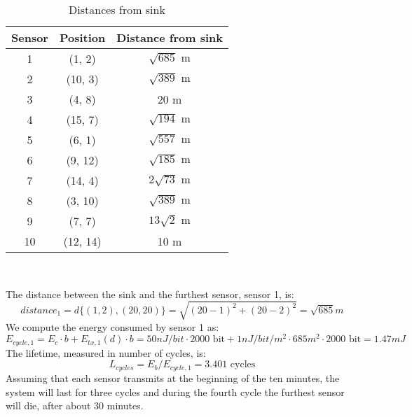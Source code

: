 \begin{table}[H]
\centering 
\begin{tabular}{| c | c | c |}
	\hline 
	\rowcolor{bluepoli!40}
	\textbf{Sensor} & \textbf{Position} & \textbf{Distance from sink}\T\B \\
	\hline 
	1 & (1, 2) & $\sqrt{685} \text{ m}$ \T\B\\
	2 &(10, 3) & $\sqrt{389} \text{ m}$ \T\B\\
	3 & (4, 8) & 20 m\T\B\\
	4 & (15, 7) & $\sqrt{194} \text{ m}$ \T\B\\
	5  & (6, 1) & $\sqrt{557} \text{ m}$ \T\B\\
	6  & (9, 12) & $\sqrt{185} \text{ m}$ \T\B\\
	7  & (14, 4) & $2\sqrt{73} \text{ m}$ \T\B\\
	8  & (3, 10) & $\sqrt{389} \text{ m}$ \T\B\\
	9  & (7, 7) & $13\sqrt{2} \text{ m}$ \T\B\\
	10  & (12, 14) & 10 m\T\B\\
	\hline
\end{tabular}
\\[10pt]
\caption{Distances from sink}
\end{table}

The distance between the sink and the furthest sensor, sensor 1, is: 
\[ 
distance_1 = d \{(1, 2) , (20, 20)\} = \sqrt{(20-1)^2 + (20-2)^2} = \sqrt{685} m 
\]
We compute the energy consumed by sensor 1 as:
\[
E_{cycle, 1} = E_c \cdot b + E_{tx, 1}(d) \cdot b = 50 nJ/bit \cdot 2000 \text{ bit} + 1 nJ/bit/m^2 \cdot 685 m^2 \cdot 2000 \text{ bit} = 1.47 mJ
\]
The lifetime, measured in number of cycles, is:
\[
L_{cycles} = E_b / E_{cycle, 1} = 3.401 \text{ cycles}
\]
Assuming that each sensor transmits at the beginning of the ten minutes, the system will last for three cycles and during the fourth cycle the furthest sensor will die, after about 30 minutes.

